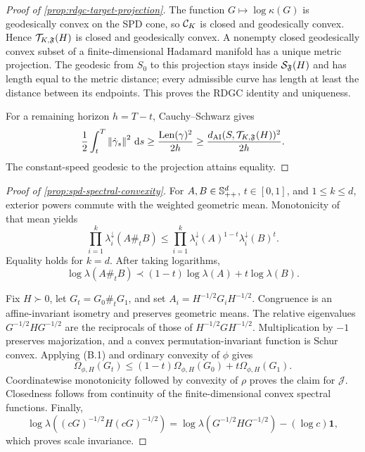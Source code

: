 \begin{proof}[Proof of \cref{prop:rdgc-target-projection}]
The function \(G\mapsto\log\kappa(G)\) is geodesically convex on the SPD
cone, so \(\mathcal C_K\) is closed and geodesically convex.  Hence
\(\mathcal T_{K,\mathfrak F}(H)\) is closed and geodesically convex.  A nonempty
closed geodesically convex subset of a finite-dimensional Hadamard manifold
has a unique metric projection.  The geodesic from \(S_0\) to this projection
stays inside \(\mathcal S_\mathfrak F(H)\) and has length equal to the metric
distance; every admissible curve has length at least the distance between its
endpoints.  This proves the RDGC identity and uniqueness.

For a remaining horizon \(h=T-t\), Cauchy--Schwarz gives
\[
  \frac12\int_t^T\left\lVert \dot\gamma_s\right\rVert^2\,\mathrm d s
  \ge
  \frac{\operatorname{Len}(\gamma)^2}{2h}
  \ge
  \frac{d_{\mathrm{AI}}(S,\mathcal T_{K,\mathfrak F}(H))^2}{2h}.
\]
The constant-speed geodesic to the projection attains equality.
\end{proof}

\begin{proof}[Proof of \cref{prop:spd-spectral-convexity}]
For \(A,B\in\mathbb S_{++}^d\), \(t\in[0,1]\), and \(1\le k\le d\), exterior powers
commute with the weighted geometric mean.  Monotonicity of that mean yields
\[
  \prod_{i=1}^k\lambda_i^\downarrow(A\#_tB)
  \le
  \prod_{i=1}^k
  \lambda_i^\downarrow(A)^{1-t}
  \lambda_i^\downarrow(B)^t.
\]
Equality holds for \(k=d\).  After taking logarithms,
\begin{equation}
  \log\lambda(A\#_tB)
  \prec
  (1-t)\log\lambda(A)+t\log\lambda(B).
  \tag{B.1}
\end{equation}

Fix \(H\succ0\), let \(G_t=G_0\#_tG_1\), and set
\(A_i=H^{-1/2}G_iH^{-1/2}\).  Congruence is an affine-invariant isometry and
preserves geometric means.  The relative eigenvalues
\(G^{-1/2}HG^{-1/2}\) are the reciprocals of those of
\(H^{-1/2}GH^{-1/2}\).  Multiplication by \(-1\) preserves majorization, and
a convex permutation-invariant function is Schur convex.  Applying
\textup{(B.1)} and ordinary convexity of \(\phi\) gives
\[
  \Omega_{\phi,H}(G_t)
  \le
  (1-t)\Omega_{\phi,H}(G_0)
  +t\Omega_{\phi,H}(G_1).
\]
Coordinatewise monotonicity followed by convexity of \(\rho\) proves the
claim for \(\mathcal J\).  Closedness follows from continuity of the
finite-dimensional convex spectral functions.  Finally,
\[
  \log\lambda((cG)^{-1/2}H(cG)^{-1/2})
  =
  \log\lambda(G^{-1/2}HG^{-1/2})-(\log c)\mathbf1,
\]
which proves scale invariance.
\end{proof}

